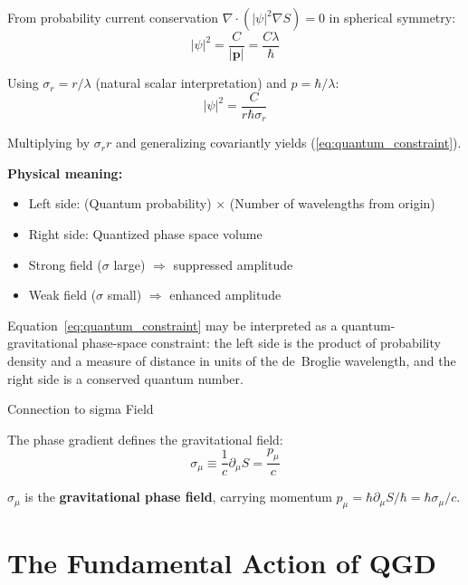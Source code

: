 \documentclass[11pt,a4paper]{article}
\theoremstyle{definition}
\theoremstyle{remark}
\begin{document}
			From probability current conservation $\nabla \cdot (|\psi|^2\nabla S) = 0$ in spherical symmetry:
			\begin{equation}
				|\psi|^2 = \frac{C}{|\mathbf{p}|} = \frac{C\lambda}{\hbar}
			\end{equation}
			
			Using $\sigma_r = r/\lambda$ (natural scalar interpretation) and $p = \hbar/\lambda$:
			\begin{equation}
				|\psi|^2 = \frac{C}{r\hbar\sigma_r}
			\end{equation}
			
			Multiplying by $\sigma_r r$ and generalizing covariantly yields (\ref{eq:quantum_constraint}).
		
		\textbf{Physical meaning:}
		\begin{itemize}
			\item Left side: (Quantum probability) $\times$ (Number of wavelengths from origin)
			\item Right side: Quantized phase space volume
			\item Strong field ($\sigma$ large) $\Rightarrow$ suppressed amplitude
			\item Weak field ($\sigma$ small) $\Rightarrow$ enhanced amplitude
		\end{itemize}
		
		Equation~\eqref{eq:quantum_constraint} may be interpreted as a quantum-gravitational phase-space constraint: the left side is the product of probability density and a measure of distance in units of the de~Broglie wavelength, and the right side is a conserved quantum number.
		
		Connection to sigma Field
		
		The phase gradient defines the gravitational field:
		\begin{equation}
			\boxed{\sigma_\mu \equiv \frac{1}{c}\partial_\mu S = \frac{p_\mu}{c}}
		\end{equation}
		
		$\sigma_\mu$ is the \textbf{gravitational phase field}, carrying momentum $p_\mu = \hbar\partial_\mu S/\hbar = \hbar\sigma_\mu/c$.


	\section{The Fundamental Action of QGD}
	\label{sec:qgd_action}
	
\end{document}

